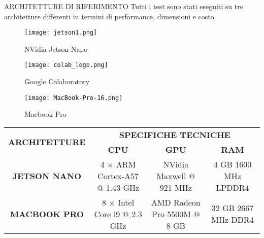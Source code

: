 \begin{frame}{ARCHITETTURE DI RIFERIMENTO}
    Tutti i test sono stati eseguiti su tre architetture differenti in termini di performance, dimensioni e costo.
    \begin{minipage}{\linewidth}
        \hspace{-1cm}
        \begin{minipage}{0.45\linewidth}
            \begin{figure}
                \texttt{[image: jetson1.png]}
                \vspace{-0.1cm}
                \caption{NVidia Jetson Nano}
            \end{figure}
            \vspace{-1.3cm}
            \begin{figure}
                \texttt{[image: colab\_logo.png]}
                \vspace{-0.6cm}
                \caption{Google Colaboratory}
            \end{figure}
            \vspace{-0.7cm}
            \begin{figure}
                \texttt{[image: MacBook-Pro-16.png]}
                \caption{Macbook Pro}
            \end{figure}
        \end{minipage}
        \begin{minipage}{0.65\linewidth}
            \begin{table}
                \centering
                \begin{adjustbox}{max width=\textwidth}
                {\Huge
                \begin{tabular}{|c||c|c|c||}
                    \hline
                    \multirow{2}{*}{\bfseries{ARCHITETTURE}} & \multicolumn{3}{c||}{\bfseries{SPECIFICHE TECNICHE}}\\            & \bfseries{CPU} & \bfseries{GPU} & \bfseries{RAM}\\
                    \hline
                    \hline
                    {\bfseries{JETSON NANO}} & 4 $\times$ ARM Cortex-A57 @ 1.43 GHz & NVidia Maxwell @ 921 MHz & 4 GB 1600 MHz LPDDR4\\
                    \hline
                    {\bfseries{MACBOOK PRO}} & 8 $\times$ Intel Core i9 @ 2.3 GHz & AMD Radeon Pro 5500M @ 8 GB & 32 GB 2667 MHz DDR4\\

\end{tabular}}
\end{adjustbox}
\end{table}
\end{minipage}
\end{minipage}
\end{frame}
